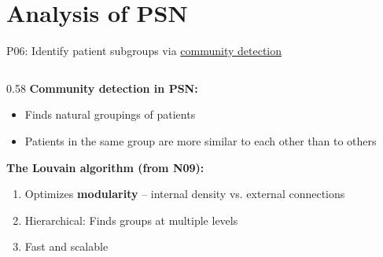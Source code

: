 \documentclass[aspectratio=169, 10pt]{beamer}
\begin{document}
\section{Analysis of PSN}

\begin{frame}{P06: Identify patient subgroups via \href{https://en.wikipedia.org/wiki/Community_structure}{community detection}}
    \begin{columns}[T]
        \begin{column}{0.58\textwidth}
            \textbf{Community detection in PSN:}
            \begin{itemize}\setlength{\itemsep}{0pt}
                \item Finds natural groupings of patients
                \item Patients in the same group are more similar to each other than to others
            \end{itemize}
            
            \vspace{2mm}
            \textbf{The Louvain algorithm (from N09):}
            \begin{enumerate}\setlength{\itemsep}{0pt}
                \item Optimizes \textbf{modularity} -- internal density vs. external connections
                \item Hierarchical: Finds groups at multiple levels
                \item Fast and scalable
            \end{enumerate}
            

\end{column}
\end{columns}
\end{frame}
\end{document}
